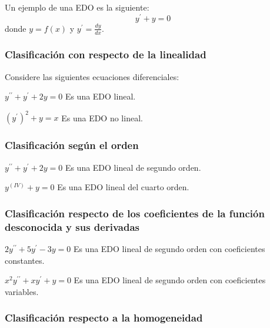 Un ejemplo de una EDO es la siguiente:
\begin{equation*}
    y^{\prime}+y=0
\end{equation*}
donde $y=f(x)$ y $y^{\prime}=\frac{dy}{dx}$.

\subsubsection{Clasificación con respecto de la linealidad}
Considere las siguientes ecuaciones diferenciales:
\begin{example}
    $y^{\prime\prime}+y^{\prime}+2y=0$
    Es una EDO lineal.
\end{example}

\begin{example}
    $\left(y^{\prime}\right)^2+y=x$
    Es una EDO no lineal.
\end{example}

\subsubsection{Clasificación según el orden}
\begin{example}
    $y^{\prime\prime}+y^{\prime}+2y=0$
    Es una EDO lineal de segundo orden.
\end{example}

\begin{example}
    $y^{(IV)}+y=0$ 
    Es una EDO lineal del cuarto orden.
\end{example}

\subsubsection{Clasificación respecto de los coeficientes de la función desconocida y sus derivadas}
\begin{example}
    $2y^{\prime\prime}+5y^{\prime}-3y=0$
    Es una EDO lineal de segundo orden con coeficientes constantes.
\end{example}

\begin{example}
    $x^2y^{\prime\prime}+xy^{\prime}+y=0$
    Es una EDO lineal de segundo orden con coeficientes variables.
\end{example}

\subsubsection{Clasificación respecto a la homogeneidad}

